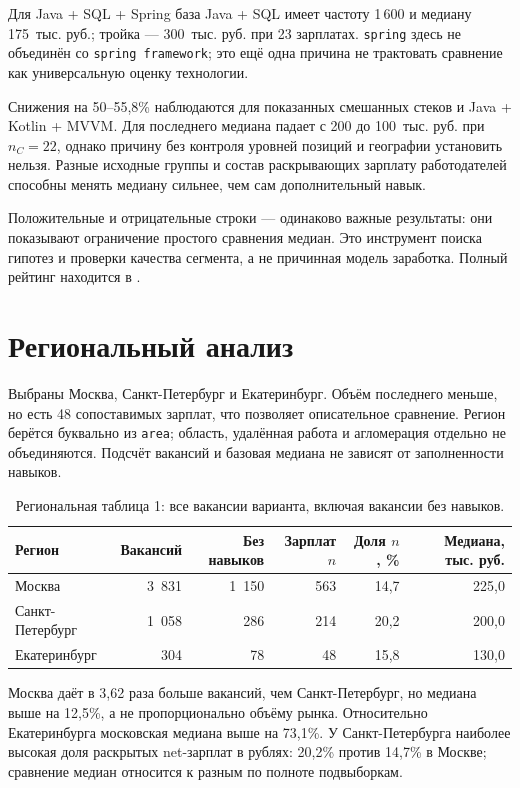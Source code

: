 \documentclass[11pt,a4paper]{article}
\begin{document}
Для Java + SQL + Spring база Java + SQL имеет частоту 1\,600 и медиану 175~тыс. руб.; тройка --- 300~тыс. руб. при 23 зарплатах. \texttt{spring} здесь не объединён со \texttt{spring framework}; это ещё одна причина не трактовать сравнение как универсальную оценку технологии.

Снижения на 50--55,8\% наблюдаются для показанных смешанных стеков и Java + Kotlin + MVVM. Для последнего медиана падает с 200 до 100~тыс. руб. при $n_C=22$, однако причину без контроля уровней позиций и географии установить нельзя. Разные исходные группы и состав раскрывающих зарплату работодателей способны менять медиану сильнее, чем сам дополнительный навык.

Положительные и отрицательные строки --- одинаково важные результаты: они показывают ограничение простого сравнения медиан. Это инструмент поиска гипотез и проверки качества сегмента, а не причинная модель заработка. Полный рейтинг находится в .

\clearpage
\section{Региональный анализ}
Выбраны Москва, Санкт-Петербург и Екатеринбург. Объём последнего меньше, но есть 48 сопоставимых зарплат, что позволяет описательное сравнение. Регион берётся буквально из \texttt{area}; область, удалённая работа и агломерация отдельно не объединяются. Подсчёт вакансий и базовая медиана не зависят от заполненности навыков.
\begin{table}[h!]
\centering\small
\caption{Региональная таблица 1: все вакансии варианта, включая вакансии без навыков.}
\begin{tabularx}{\linewidth}{>{\raggedright\arraybackslash}Xrrrrr}\toprule
Регион & Вакансий & Без навыков & Зарплат $n$ & Доля $n$, \% & Медиана, тыс. руб.\\\midrule
Москва & 3~831 & 1~150 & 563 & 14,7 & 225,0\\
Санкт-Петербург & 1~058 & 286 & 214 & 20,2 & 200,0\\
Екатеринбург & 304 & 78 & 48 & 15,8 & 130,0\\
\bottomrule\end{tabularx}
\end{table}

Москва даёт в 3,62 раза больше вакансий, чем Санкт-Петербург, но медиана выше на 12,5\%, а не пропорционально объёму рынка. Относительно Екатеринбурга московская медиана выше на 73,1\%. У Санкт-Петербурга наиболее высокая доля раскрытых net-зарплат в рублях: 20,2\% против 14,7\% в Москве; сравнение медиан относится к разным по полноте подвыборкам.
\end{document}

